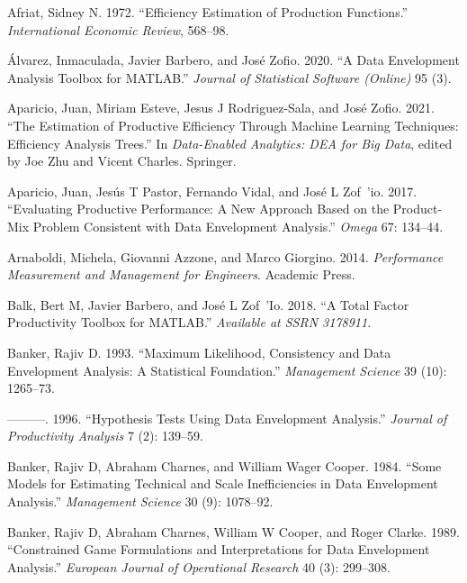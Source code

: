 \hypertarget{refs}{}
\begin{CSLReferences}{1}{0}
\leavevmode{}%
Afriat, Sidney N. 1972. {``Efficiency Estimation of Production Functions.''} \emph{International Economic Review}, 568--98.

\leavevmode{}%
Álvarez, Inmaculada, Javier Barbero, and José Zofio. 2020. {``A Data Envelopment Analysis Toolbox for MATLAB.''} \emph{Journal of Statistical Software (Online)} 95 (3).

\leavevmode{}%
Aparicio, Juan, Miriam Esteve, Jesus J Rodriguez-Sala, and José Zofio. 2021. {``The Estimation of Productive Efficiency Through Machine Learning Techniques: Efficiency Analysis Trees.''} In \emph{Data-Enabled Analytics: DEA for Big Data}, edited by Joe Zhu and Vicent Charles. Springer.

\leavevmode{}%
Aparicio, Juan, Jesús T Pastor, Fernando Vidal, and José L Zof~'io. 2017. {``Evaluating Productive Performance: A New Approach Based on the Product-Mix Problem Consistent with Data Envelopment Analysis.''} \emph{Omega} 67: 134--44.

\leavevmode{}%
Arnaboldi, Michela, Giovanni Azzone, and Marco Giorgino. 2014. \emph{Performance Measurement and Management for Engineers}. Academic Press.

\leavevmode{}%
Balk, Bert M, Javier Barbero, and José L Zof~'Io. 2018. {``A Total Factor Productivity Toolbox for MATLAB.''} \emph{Available at SSRN 3178911}.

\leavevmode{}%
Banker, Rajiv D. 1993. {``Maximum Likelihood, Consistency and Data Envelopment Analysis: A Statistical Foundation.''} \emph{Management Science} 39 (10): 1265--73.

\leavevmode{}%
---------. 1996. {``Hypothesis Tests Using Data Envelopment Analysis.''} \emph{Journal of Productivity Analysis} 7 (2): 139--59.

\leavevmode{}%
Banker, Rajiv D, Abraham Charnes, and William Wager Cooper. 1984. {``Some Models for Estimating Technical and Scale Inefficiencies in Data Envelopment Analysis.''} \emph{Management Science} 30 (9): 1078--92.

\leavevmode{}%
Banker, Rajiv D, Abraham Charnes, William W Cooper, and Roger Clarke. 1989. {``Constrained Game Formulations and Interpretations for Data Envelopment Analysis.''} \emph{European Journal of Operational Research} 40 (3): 299--308.


\end{CSLReferences}
